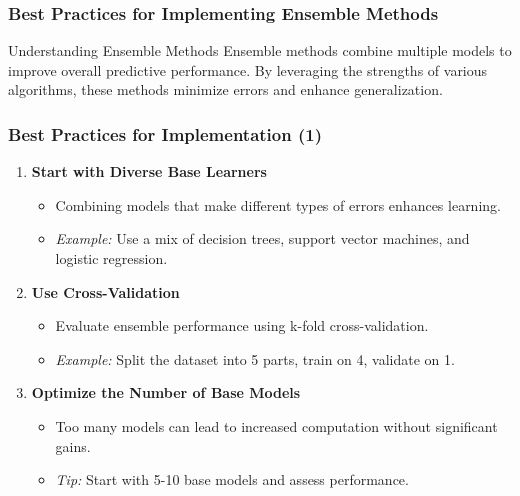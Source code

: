 \documentclass[aspectratio=169]{beamer}
\begin{document}
\begin{frame}[fragile]
    \frametitle{Best Practices for Implementing Ensemble Methods}
    \begin{block}{Understanding Ensemble Methods}
        Ensemble methods combine multiple models to improve overall predictive performance. By leveraging the strengths of various algorithms, these methods minimize errors and enhance generalization.
    \end{block}
\end{frame}

\begin{frame}[fragile]
    \frametitle{Best Practices for Implementation (1)}
    \begin{enumerate}
        \item \textbf{Start with Diverse Base Learners}
        \begin{itemize}
            \item Combining models that make different types of errors enhances learning.
            \item \textit{Example:} Use a mix of decision trees, support vector machines, and logistic regression.
        \end{itemize}
        
        \item \textbf{Use Cross-Validation}
        \begin{itemize}
            \item Evaluate ensemble performance using k-fold cross-validation.
            \item \textit{Example:} Split the dataset into 5 parts, train on 4, validate on 1.
        \end{itemize}
        
        \item \textbf{Optimize the Number of Base Models}
        \begin{itemize}
            \item Too many models can lead to increased computation without significant gains.
            \item \textit{Tip:} Start with 5-10 base models and assess performance.
        \end{itemize}
    \end{enumerate}
\end{frame}
\end{document}
